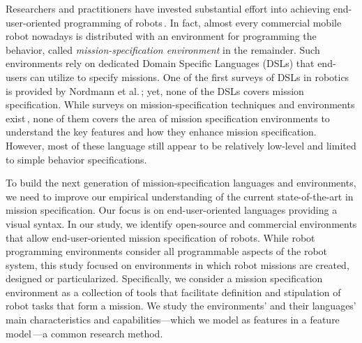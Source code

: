 

Researchers and practitioners have invested substantial effort into achieving end-user-oriented programming of robots\,\cite{Weintrop2018,Biggs2003,Bozhinoski2016b,Arts2010,Nordmann2016a}. In fact, almost every commercial mobile robot nowadays is distributed with an environment for programming the behavior, called \emph{mission-specification environment} in the remainder. Such environments rely on dedicated Domain Specific Languages (DSLs) that end-users can utilize to specify missions. 
One of the first surveys of DSLs in robotics is provided by Nordmann et al.\,\cite{Nordmann2014,Nordmann2016a}; yet, none of the DSLs covers mission specification. While surveys on mission-specification techniques and environments exist\,\cite{Biggs2003,Bravo2018,Luckcuck2018},
none of them covers the area of mission specification environments to understand the key features and how they enhance mission specification. However, most of these language still appear to be relatively low-level and limited to simple behavior specifications.

To build the next generation of mission-specification languages and environments, we need to improve our empirical understanding of the current state-of-the-art in mission specification. Our focus is on end-user-oriented languages providing a visual syntax. In our study, we identify open-source and commercial environments that allow end-user-oriented mission specification of robots. While robot programming environments consider all programmable aspects of the robot system, this study focused on environments in which robot missions are created, designed or particularized. Specifically, we consider a mission specification environment as a collection of tools that facilitate definition and stipulation of robot tasks that form a mission. We study the environments' and their languages' main characteristics and capabilities---which we model as features in a feature model\,\cite{kang.ea:1990:foda,damir2019principles}---a common research method. %

